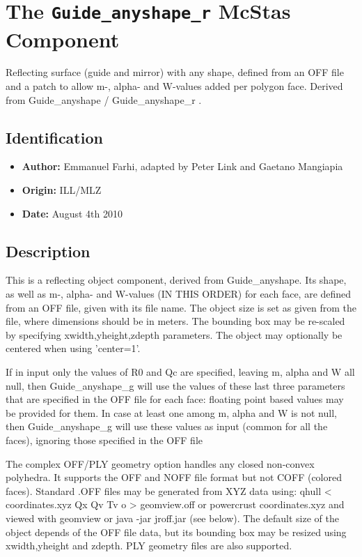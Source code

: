 \section{The \texttt{Guide\_anyshape\_r} McStas Component}
Reflecting surface (guide and mirror) with any shape, defined from an OFF file
and a patch to allow m-, alpha- and W-values added per polygon face.
Derived from Guide\_anyshape / Guide\_anyshape\_r .

\subsection*{Identification}
\begin{itemize}
  \item \textbf{Author:} Emmanuel Farhi, adapted by Peter Link and Gaetano Mangiapia
  \item \textbf{Origin:} ILL/MLZ
  \item \textbf{Date:} August 4th 2010
\end{itemize}

\subsection*{Description}
This is a reflecting object component, derived from Guide\_anyshape. Its shape, as well as m-, alpha- and W-values (IN THIS ORDER) for each face, are defined from an OFF file, given with its file name. The object size is set as given from the file, where dimensions should be in meters. The bounding box may be re-scaled by specifying xwidth,yheight,zdepth parameters. The object may optionally be centered when using 'center=1'.

If in input only the values of R0 and Qc are specified, leaving m, alpha and W all null, then Guide\_anyshape\_g will use the values of these last three parameters that are specified in the OFF file for each face: floating point based values may be provided for them. In case at least one among m, alpha and W is not null, then Guide\_anyshape\_g will use these values as input (common for all the faces), ignoring those specified in the OFF file

The complex OFF/PLY geometry option handles any closed non-convex polyhedra. It supports the OFF and NOFF file format but not COFF (colored faces). Standard .OFF files may be generated from XYZ data using: qhull \textless{} coordinates.xyz Qx Qv Tv o \textgreater{} geomview.off or powercrust coordinates.xyz and viewed with geomview or java -jar jroff.jar (see below). The default size of the object depends of the OFF file data, but its bounding box may be resized using xwidth,yheight and zdepth. PLY geometry files are also supported.

